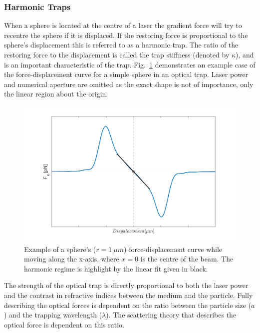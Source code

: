 \subsubsection{Harmonic Traps}
\label{sec:harmonic_traps}
When a sphere is located at the centre of a laser the gradient 
force will try to recentre the sphere if it is displaced. If 
the restoring force is proportional to the sphere's displacement 
this is referred to as a harmonic trap. The ratio of the restoring 
force to the displacement is called the trap stiffness (denoted 
by $\kappa$), and is an important characteristic of the trap. 
Fig.~\ref{fig:harmonic_trap} demonstrates an example case of the
force-displacement curve for a simple sphere in an optical trap. 
Laser power and numerical aperture are omitted as the exact shape 
is not of importance, only the linear region about the origin.
\begin{figure}[h!]
	\centering
	\includegraphics[width=1.1\linewidth]{sphere_force_curve.png}
	\caption{Example of a sphere's ($r=1\ \mu m$) force-displacement
		curve while moving along the x-axis, where $x=0$ is the 
		centre of the beam. The harmonic regime is highlight by the 
		linear fit given in black.}
	\label{fig:harmonic_trap}
\end{figure}

The strength of the optical trap is directly proportional to 
both the laser power and the contrast in refractive indices 
between the medium and the particle. Fully describing the 
optical forces is dependent on the ratio between the particle 
size ($a$) and the trapping wavelength ($\lambda$). The 
scattering theory that describes the optical force is dependent 
on this ratio.  

